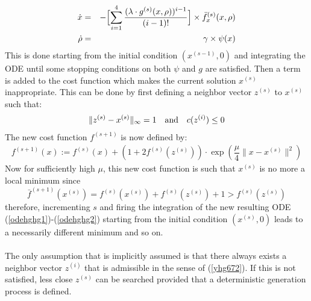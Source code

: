 \documentclass{article}
\begin{document}
\begin{eqnarray}
\dot x&=&-\Bigl[\sum_{i=1}^{4}\dfrac{(\lambda\cdot g^{(s)}(x,\rho))^{i-1}}{(i-1)!}\Bigr]\times \bar f_x^{(s)}(x,\rho) \label{odehghg1}\\
\dot \rho &=& \gamma\times \psi(x) \label{odehghg2} 
\end{eqnarray}  
This is done starting from the initial condition $(x^{(s-1)},0)$ and integrating the ODE until some stopping conditions on both $\psi$ and $g$ are satisfied. Then a term is added to the cost function which makes the current solution $x^{(s)}$ inappropriate. This can be done by first defining a neighbor vector $z^{(s)}$ to $x^{(s)}$ such that:
\begin{eqnarray}
\|z^{(s)}-x^{(s)}\|_\infty=1\quad \mbox{\rm and}\quad   c(z^{(i)})\le 0 \label{yhg672} 
\end{eqnarray} 
The new cost function $f^{(s+1)}$ is now defined by:
\begin{eqnarray*}
f^{(s+1)}(x):=f^{(s)}(x)+(1+2f^{(s)}(z^{(s)}))\cdot \exp(\dfrac{\mu}{4}\|x-x^{(s)}\|^2)
\end{eqnarray*} 
Now for sufficiently high $\mu$, this new cost function is such that $x^{(s)}$ is no more a local minimum since 
$$\bar f^{(s+1)}(x^{(s)})=f^{(s)}(x^{(s)})+f^{(s)}(z^{(s)})+1>f^{(s)}(z^{(s)})$$
therefore, incrementing $s$ and firing the integration of the new resulting ODE (\ref{odehghg1})-(\ref{odehghg2}) starting from the initial condition $(x^{(s)},0)$ leads to a necessarily different minimum and so on. \ \\ \ \\ 
The only assumption that is implicitly assumed is that there always exists a neighbor vector $z^{(i)}$ that is admissible in the sense of (\ref{yhg672}). If this is not satisfied, less close $z^{(s)}$ can be searched provided that a deterministic generation process is defined.
\end{document}
